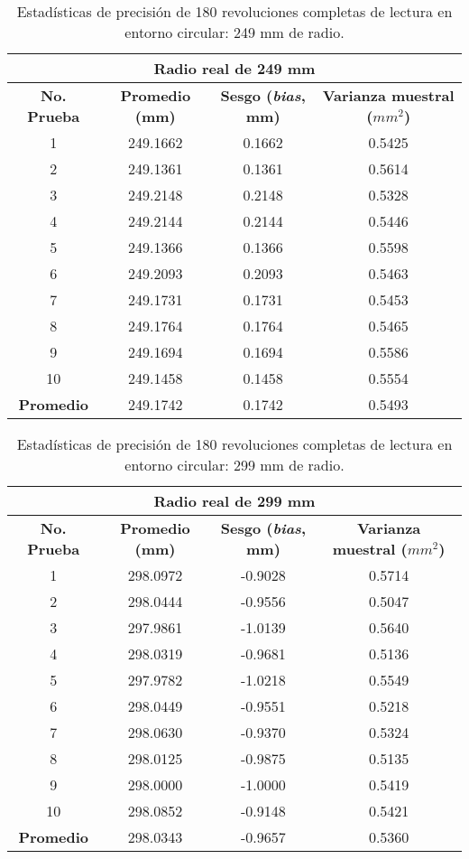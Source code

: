 \begin{table}[H]
	\centering
	\begin{tabular}{|c|c|c|c|}
		\hline
		\multicolumn{4}{|c|}{\textbf{Radio real de 249 mm}} \\ \hline
		\textbf{No. Prueba} & \textbf{Promedio (mm)} & \textbf{Sesgo (\textit{bias}, mm)} & \textbf{Varianza muestral ($mm^2$)} \\ \hline
		1 & 249.1662 & 0.1662 & 0.5425 \\ 
		2 & 249.1361 & 0.1361 & 0.5614 \\ 
		3 & 249.2148 & 0.2148 & 0.5328 \\ 
		4 & 249.2144 & 0.2144 & 0.5446 \\ 
		5 & 249.1366 & 0.1366 & 0.5598 \\ 
		6 & 249.2093 & 0.2093 & 0.5463 \\ 
		7 & 249.1731 & 0.1731 & 0.5453 \\ 
		8 & 249.1764 & 0.1764 & 0.5465 \\ 
		9 & 249.1694 & 0.1694 & 0.5586 \\ 
		10 & 249.1458 & 0.1458 & 0.5554 \\ \hline
		\textbf{Promedio} & 249.1742 & 0.1742 & 0.5493 \\ \hline
	\end{tabular}
	\caption{Estadísticas de precisión de 180 revoluciones completas de lectura en entorno circular: 249 mm de radio.}
	\label{fig:tabla_dists3}
\end{table}

\begin{table}[H]
	\centering
	\begin{tabular}{|c|c|c|c|}
		\hline
		\multicolumn{4}{|c|}{\textbf{Radio real de 299 mm}} \\ \hline
		\textbf{No. Prueba} & \textbf{Promedio (mm)} & \textbf{Sesgo (\textit{bias}, mm)} & \textbf{Varianza muestral ($mm^2$)} \\ \hline
		1 & 298.0972 & -0.9028 & 0.5714 \\ 
		2 & 298.0444 & -0.9556 & 0.5047 \\ 
		3 & 297.9861 & -1.0139 & 0.5640 \\ 
		4 & 298.0319 & -0.9681 & 0.5136 \\ 
		5 & 297.9782 & -1.0218 & 0.5549 \\ 
		6 & 298.0449 & -0.9551 & 0.5218 \\ 
		7 & 298.0630 & -0.9370 & 0.5324 \\ 
		8 & 298.0125 & -0.9875 & 0.5135 \\ 
		9 & 298.0000 & -1.0000 & 0.5419 \\ 
		10 & 298.0852 & -0.9148 & 0.5421 \\ \hline
		\textbf{Promedio} & 298.0343 & -0.9657 & 0.5360 \\ \hline
	\end{tabular}
	\caption{Estadísticas de precisión de 180 revoluciones completas de lectura en entorno circular: 299 mm de radio.}
	\label{fig:tabla_dists4}
\end{table}

